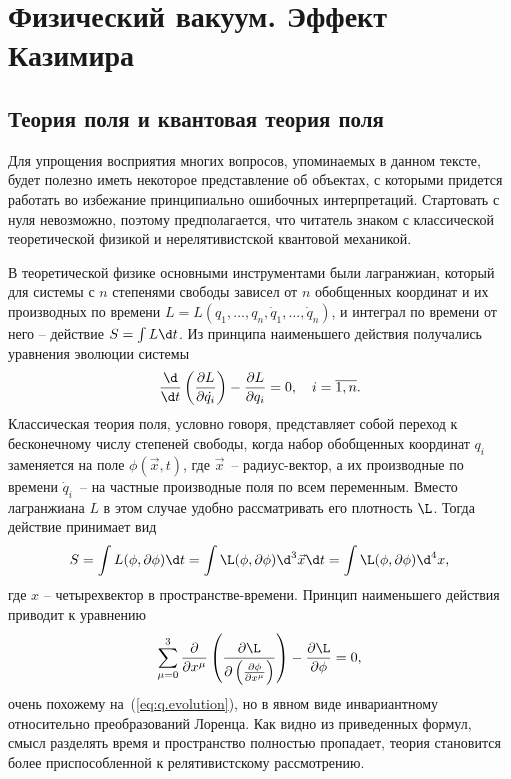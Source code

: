 \section{Физический вакуум. Эффект Казимира}

\subsection{Теория поля и квантовая теория поля}
Для упрощения восприятия многих вопросов, упоминаемых в данном тексте, будет полезно иметь некоторое представление об объектах, с которыми придется работать во избежание принципиально ошибочных интерпретаций. 
Стартовать с нуля невозможно, поэтому предполагается, что читатель знаком с классической теоретической физикой и нерелятивистской квантовой механикой. 

В теоретической физике основными инструментами были лагранжиан, который для системы с $n$ степенями свободы зависел от $n$ обобщенных координат и их производных по времени $L = L(q_1, \ldots, q_n, \dot{q}_1, \ldots, \dot{q}_n)$, и интеграл по времени от него -- действие $S = \int L\d t$. 
Из принципа наименьшего действия получались уравнения эволюции системы
\begin{equation}
\frac{\d}{\d t} \left(\frac{\partial L}{\partial \dot{q_i}}\right) - \frac{\partial L}{\partial q_i} = 0 ,
\quad
i = \overline{1,n}
.
\label{eq:q.evolution}
\end{equation}
Классическая теория поля, условно говоря, представляет собой переход к бесконечному числу степеней свободы, когда набор обобщенных координат $q_i$ заменяется на поле $\phi(\vec{x}, t)$, где $\vec{x}$~-- радиус-вектор, а их производные по времени $\dot{q}_i$~-- на частные производные поля по всем переменным. 
Вместо лагранжиана $L$ в этом случае удобно рассматривать его плотность $\L$. 
Тогда действие принимает вид 
$$
S = \int L(\phi, \partial\phi) \d t = \int \L(\phi, \partial\phi) \d^3 \vec{x} \d t = \int \L(\phi, \partial\phi) \d^4x,
$$
где $x$ -- четырехвектор в пространстве-времени. 
Принцип наименьшего действия приводит к уравнению
\begin{equation}
\sum\limits_{\mu=0}^{3}\frac{\partial}{\partial x^\mu} \left(\frac{\partial \L}{\partial \left(\frac{\partial \phi}{\partial x^\mu}\right)}\right) - \frac{\partial \L}{\partial\phi} = 0 ,
\label{eq:phi.evolution}
\end{equation}
очень похожему на~(\ref{eq:q.evolution}), но в явном виде инвариантному относительно преобразований Лоренца.
Как видно из приведенных формул, смысл разделять время и пространство полностью пропадает, теория становится более приспособленной к релятивистскому рассмотрению. 

